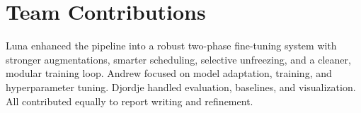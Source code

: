 \documentclass[11pt]{article}
\begin{document}



\section*{Team Contributions}

Luna enhanced the pipeline into a robust two-phase fine-tuning system with stronger augmentations, smarter scheduling, selective unfreezing, and a cleaner, modular training loop. Andrew focused on model adaptation, training, and hyperparameter tuning. Djordje handled evaluation, baselines, and visualization. All contributed equally to report writing and refinement.
%

% 



\end{document}
